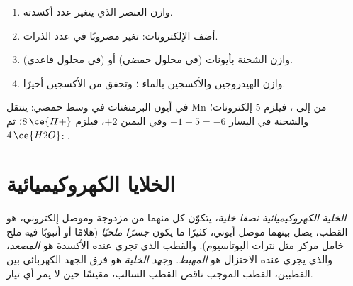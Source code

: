 \begin{method}\label{met:b1:nernst:balance-by-on}
\begin{enumerate}
  \item وازن العنصر الذي يتغير عدد أكسدته.
  \item أضف الإلكترونات: تغير  مضروبًا في
        عدد الذرات.
  \item وازن الشحنة بأيونات  (في محلول حمضي) أو 
        (في محلول قاعدي).
  \item وازن الهيدروجين والأكسجين بالماء ؛ وتحقق من الأكسجين أخيرًا.
\end{enumerate}
في أيون البرمنغنات في وسط حمضي: ينتقل Mn من  إلى ، فيلزم 5
إلكترونات؛ والشحنة في اليسار $-1 - 5 = -6$ وفي اليمين $+2$،
فيلزم $8\,\ce{H+}$؛ ثم $4\,\ce{H2O}$:
.
\end{method}

\section{الخلايا الكهروكيميائية}

\begin{definition}\label{def:b1:nernst:cell}
\emph{الخلية الكهروكيميائية}
\emph{نصفا خلية}، يتكوّن كل منهما من مزدوجة
وموصل إلكتروني، هو القطب، يصل بينهما موصل أيوني، كثيرًا ما يكون
\emph{جسرًا ملحيًا} (هلامًا أو أنبوبًا فيه ملح خامل مركز
مثل نترات البوتاسيوم). والقطب الذي تجري عنده الأكسدة
هو \emph{المصعد}، والذي يجري عنده الاختزال
هو \emph{المهبط}. و\emph{جهد
الخلية} هو فرق الجهد الكهربائي
بين القطبين، القطب الموجب ناقص القطب السالب، مقيسًا
حين لا يمر أي تيار.
\end{definition}

